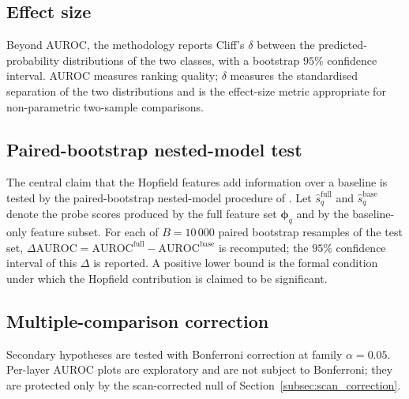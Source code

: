 \subsection{Effect size}
\label{subsec:effect_size}

Beyond AUROC, the methodology reports Cliff's $\delta$ between the
predicted-probability distributions of the two classes, with a
bootstrap $95\%$ confidence interval. AUROC measures ranking quality;
$\delta$ measures the standardised separation of the two distributions
and is the effect-size metric appropriate for non-parametric two-sample
comparisons.

\subsection{Paired-bootstrap nested-model test}
\label{subsec:paired_bootstrap}

The central claim that the Hopfield features add information over a
baseline is tested by the paired-bootstrap nested-model procedure of
\citet{efron1994introduction}. Let $\hat{s}^{\mathrm{full}}_q$ and
$\hat{s}^{\mathrm{base}}_q$ denote the probe scores produced by the
full feature set $\boldsymbol{\phi}_q$ and by the baseline-only feature
subset. For each of $B = 10\,000$ paired bootstrap resamples of the
test set, $\Delta\mathrm{AUROC} = \mathrm{AUROC}^{\mathrm{full}} -
\mathrm{AUROC}^{\mathrm{base}}$ is recomputed; the $95\%$ confidence
interval of this $\Delta$ is reported. A positive lower bound is the
formal condition under which the Hopfield contribution is claimed to be
significant.

\subsection{Multiple-comparison correction}
\label{subsec:multiple_comparison}

Secondary hypotheses are tested with Bonferroni correction at family
$\alpha = 0.05$. Per-layer AUROC plots are exploratory and are not
subject to Bonferroni; they are protected only by the scan-corrected
null of Section~\ref{subsec:scan_correction}.

